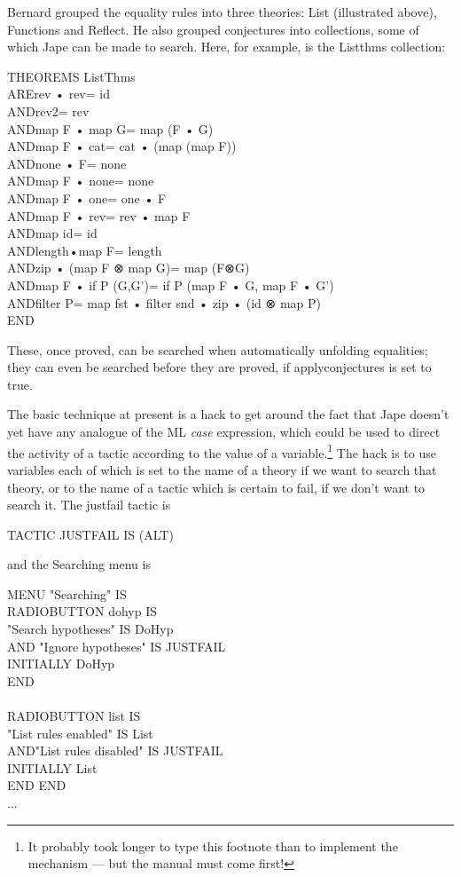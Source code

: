 Bernard grouped the equality rules into three theories: List (illustrated above), Functions and Reflect. He also grouped conjectures into collections, some of which Jape can be made to search. Here, for example, is the Listthms collection:
\begin{japeish}
THEOREMS ListThms\\
ARE\tab rev • rev\tab = id\\
AND\tab rev2\tab = rev\\
AND\tab map F • map G\tab = map (F • G)\\
AND\tab map F • cat\tab = cat • (map (map F))\\
AND\tab none • F\tab = none\\
AND\tab map F • none\tab = none\\
AND\tab map F • one\tab = one • F\\
AND\tab map F • rev\tab = rev • map F\\
AND\tab map id\tab = id\\
AND\tab length•map F\tab = length\\
AND\tab zip • (map F ⊗ map G)\tab = map (F⊗G)\\
AND\tab map F • if P (G,G')\tab = if P (map F • G, map F • G')\\
AND\tab filter P\tab = map fst • filter snd • zip • (id ⊗ map P)\\
END
\end{japeish}

These, once proved, can be searched when automatically unfolding equalities; they can even be searched before they are proved, if applyconjectures is set to true.

The basic technique at present is a hack to get around the fact that Jape doesn't yet have any analogue of the ML \textit{case} expression, which could be used to direct the activity of a tactic according to the value of a variable.\footnote{It probably took longer to type this footnote than to implement the mechanism --- but the manual must come first!} The hack is to use variables each of which is set to the name of a theory if we want to search that theory, or to the name of a tactic which is certain to fail, if we don't want to search it. The justfail tactic is
\begin{japeish}
TACTIC JUSTFAIL IS (ALT)
\end{japeish}
and the Searching menu is
\begin{japeish}
MENU "Searching" IS\\
\tab RADIOBUTTON dohyp IS \\
\tab "Search hypotheses" IS DoHyp\\
\tab AND "Ignore hypotheses" IS JUSTFAIL\\
\tab INITIALLY DoHyp\\
\tab END \\
\\
\tab RADIOBUTTON list IS \\
\tab "List rules enabled" IS List\\
\tab AND\tab "List rules disabled" IS JUSTFAIL\\
\tab INITIALLY List\\
\tab END
END \\
...
\end{japeish}


